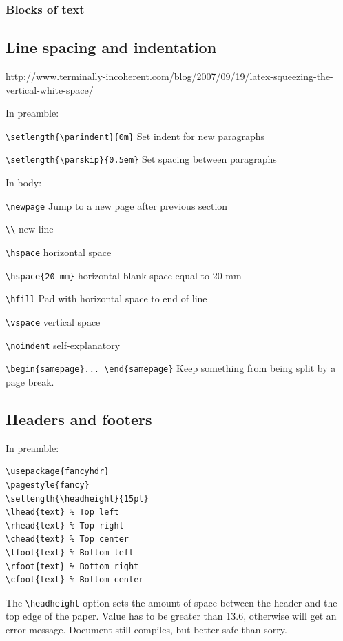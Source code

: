 \documentclass{article}
\begin{document}
\subsubsection{Blocks of text}

\subsection{Line spacing and indentation}
\url{http://www.terminally-incoherent.com/blog/2007/09/19/latex-squeezing-the-vertical-white-space/}

In preamble:

\verb|\setlength{\parindent}{0m}| Set indent for new paragraphs\par
\verb|\setlength{\parskip}{0.5em}| Set spacing between paragraphs

In body:
\begin{itemize*}
    \item \verb|\newpage| Jump to a new page after previous section
    \item \verb|\\| new line
    \item \verb|\hspace| horizontal space
    \item \verb|\hspace{20 mm}| horizontal blank space equal to 20 mm
    \item \verb|\hfill| Pad with horizontal space to end of line
    \item \verb|\vspace| vertical space
    \item \verb|\noindent| self-explanatory
    \item \verb|\begin{samepage}... \end{samepage}| Keep something from
        being split by a page break.
\end{itemize*}

\subsection{Headers and footers}
In preamble:
\begin{verbatim}
\usepackage{fancyhdr}
\pagestyle{fancy}
\setlength{\headheight}{15pt}
\lhead{text} % Top left
\rhead{text} % Top right
\chead{text} % Top center
\lfoot{text} % Bottom left
\rfoot{text} % Bottom right
\cfoot{text} % Bottom center
\end{verbatim}

The \verb|\headheight| option sets the amount of space between the
header and the top edge of the paper. Value has to be greater than
13.6, otherwise will get an error message. Document still
compiles, but better safe than sorry.
\end{document}
